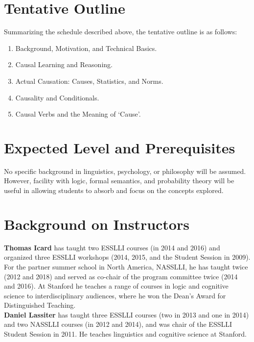 \documentclass[english]{article}
\begin{document}

\section*{\large{Tentative Outline}}

Summarizing the schedule described above, the tentative outline is as follows:

\normalsize{
\begin{enumerate}
  \item Background, Motivation, and Technical Basics.
  \item Causal Learning and Reasoning.
  \item Actual Causation: Causes, Statistics, and Norms.
  \item Causality and Conditionals.
  \item Causal Verbs and the Meaning of `Cause'.
\end{enumerate}
}

\section*{\large{Expected Level and Prerequisites}}
No specific background in linguistics, psychology, or philosophy will be assumed. However, facility with logic, formal semantics, and probability theory will be useful in allowing students to absorb and focus on the concepts explored. 


\section*{\large{Background on Instructors}}

\textbf{Thomas Icard} has taught two ESSLLI courses (in 2014 and 2016) and organized three ESSLLI workshops (2014, 2015, and the Student Session in 2009). For the partner summer school in North America, NASSLLI, he has taught twice (2012 and 2018) and served as co-chair of the program committee twice (2014 and 2016). At Stanford he teaches a range of courses in logic and cognitive science to interdisciplinary audiences, where he won the Dean's Award for Distinguished Teaching. \\

\noindent \textbf{Daniel Lassiter} has taught three ESSLLI courses (two in 2013 and one in 2014) and two NASSLLI courses (in 2012 and 2014), and was chair of the ESSLLI Student Session in 2011. He teaches linguistics and cognitive science at Stanford. 




 
\end{document}
